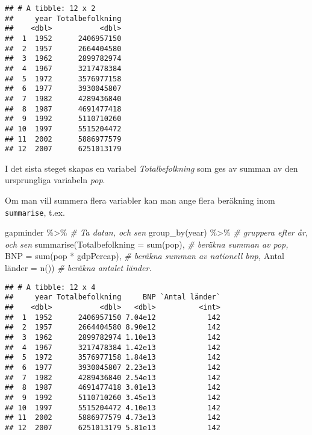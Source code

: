 \documentclass[
]{book}
\newenvironment{Shaded}{\begin{snugshade}}{\end{snugshade}}
\newcommand{\AttributeTok}[1]{\textcolor[rgb]{0.77,0.63,0.00}{#1}}
\newcommand{\CommentTok}[1]{\textcolor[rgb]{0.56,0.35,0.01}{\textit{#1}}}
\newcommand{\FunctionTok}[1]{\textcolor[rgb]{0.00,0.00,0.00}{#1}}
\newcommand{\NormalTok}[1]{#1}
\newcommand{\OtherTok}[1]{\textcolor[rgb]{0.56,0.35,0.01}{#1}}
\newcommand{\SpecialCharTok}[1]{\textcolor[rgb]{0.00,0.00,0.00}{#1}}
\newcommand{\StringTok}[1]{\textcolor[rgb]{0.31,0.60,0.02}{#1}}
\theoremstyle{definition}
\theoremstyle{definition}
\theoremstyle{definition}
\theoremstyle{definition}
\theoremstyle{remark}
\begin{document}
\begin{verbatim}
## # A tibble: 12 x 2
##     year Totalbefolkning
##    <dbl>           <dbl>
##  1  1952      2406957150
##  2  1957      2664404580
##  3  1962      2899782974
##  4  1967      3217478384
##  5  1972      3576977158
##  6  1977      3930045807
##  7  1982      4289436840
##  8  1987      4691477418
##  9  1992      5110710260
## 10  1997      5515204472
## 11  2002      5886977579
## 12  2007      6251013179
\end{verbatim}

I det sista steget skapas en variabel \emph{Totalbefolkning} som ges av summan av den ursprungliga variabeln \emph{pop}.

Om man vill summera flera variabler kan man ange flera beräkning inom \texttt{summarise}, t.ex.

\begin{Shaded}
\begin{Highlighting}[]
\NormalTok{gapminder }\SpecialCharTok{\%\textgreater{}\%}                                    \CommentTok{\# Ta datan, och sen}
  \FunctionTok{group\_by}\NormalTok{(year) }\SpecialCharTok{\%\textgreater{}\%}                             \CommentTok{\# gruppera efter år, och sen}
  \FunctionTok{summarise}\NormalTok{(}\AttributeTok{Totalbefolkning =} \FunctionTok{sum}\NormalTok{(pop),          }\CommentTok{\# beräkna summan av pop,}
            \AttributeTok{BNP =} \FunctionTok{sum}\NormalTok{(pop }\SpecialCharTok{*}\NormalTok{ gdpPercap),          }\CommentTok{\# beräkna summan av nationell bnp,}
            \StringTok{\textasciigrave{}}\AttributeTok{Antal länder}\StringTok{\textasciigrave{}} \OtherTok{=} \FunctionTok{n}\NormalTok{())                }\CommentTok{\# beräkna antalet länder.}
\end{Highlighting}
\end{Shaded}

\begin{verbatim}
## # A tibble: 12 x 4
##     year Totalbefolkning     BNP `Antal länder`
##    <dbl>           <dbl>   <dbl>          <int>
##  1  1952      2406957150 7.04e12            142
##  2  1957      2664404580 8.90e12            142
##  3  1962      2899782974 1.10e13            142
##  4  1967      3217478384 1.42e13            142
##  5  1972      3576977158 1.84e13            142
##  6  1977      3930045807 2.23e13            142
##  7  1982      4289436840 2.54e13            142
##  8  1987      4691477418 3.01e13            142
##  9  1992      5110710260 3.45e13            142
## 10  1997      5515204472 4.10e13            142
## 11  2002      5886977579 4.73e13            142
## 12  2007      6251013179 5.81e13            142
\end{verbatim}
\end{document}
